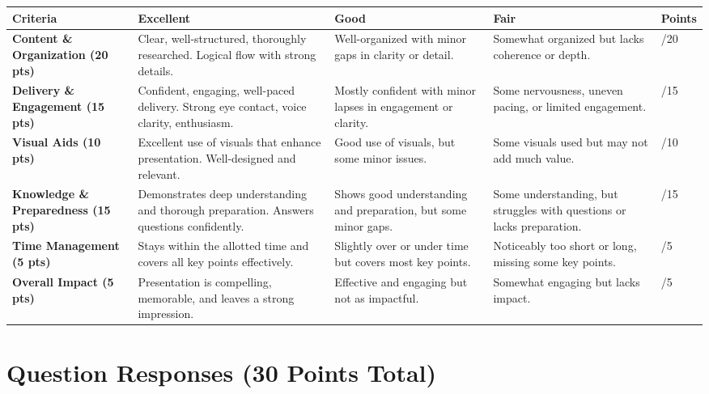\documentclass{article}
\begin{document}
\renewcommand{\arraystretch}{1.3}
\begin{tabular}{|p{4cm}|p{3cm}|p{3cm}|p{3cm}|p{2cm}|}
    \hline
    \textbf{Criteria} & \textbf{Excellent} & \textbf{Good} & \textbf{Fair} & \textbf{Points} \\
    \hline
    \textbf{Content \& Organization (20 pts)} & Clear, well-structured, thoroughly researched. Logical flow with strong details. & Well-organized with minor gaps in clarity or detail. & Somewhat organized but lacks coherence or depth. & \hspace{1cm} /20 \\
    \hline
    \textbf{Delivery \& Engagement (15 pts)} & Confident, engaging, well-paced delivery. Strong eye contact, voice clarity, enthusiasm. & Mostly confident with minor lapses in engagement or clarity. & Some nervousness, uneven pacing, or limited engagement. & \hspace{1cm} /15 \\
    \hline
    \textbf{Visual Aids (10 pts)} & Excellent use of visuals that enhance presentation. Well-designed and relevant. & Good use of visuals, but some minor issues. & Some visuals used but may not add much value. & \hspace{1cm} /10 \\
    \hline
    \textbf{Knowledge \& Preparedness (15 pts)} & Demonstrates deep understanding and thorough preparation. Answers questions confidently. & Shows good understanding and preparation, but some minor gaps. & Some understanding, but struggles with questions or lacks preparation. & \hspace{1cm} /15 \\
    \hline
    \textbf{Time Management (5 pts)} & Stays within the allotted time and covers all key points effectively. & Slightly over or under time but covers most key points. & Noticeably too short or long, missing some key points. & \hspace{1cm} /5 \\
    \hline
    \textbf{Overall Impact (5 pts)} & Presentation is compelling, memorable, and leaves a strong impression. & Effective and engaging but not as impactful. & Somewhat engaging but lacks impact. & \hspace{1cm} /5 \\
    \hline
\end{tabular}
\newpage
\section*{Question Responses (30 Points Total)}
\end{document}
